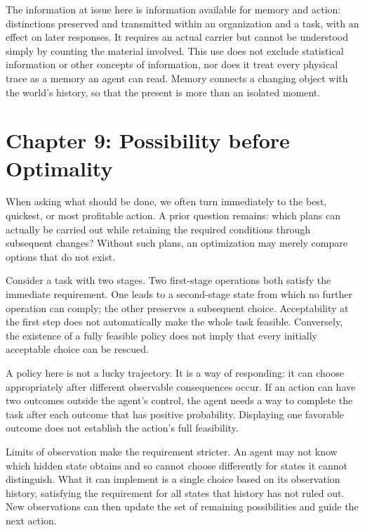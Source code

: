 \documentclass[
  english,
  11pt,
  oneside]{book}
\begin{document}
\begingroup{}

The information at issue here is information available for memory and action: distinctions preserved and transmitted within an organization and a task, with an effect on later responses. It requires an actual carrier but cannot be understood simply by counting the material involved. This use does not exclude statistical information or other concepts of information, nor does it treat every physical trace as a memory an agent can read. Memory connects a changing object with the world's history, so that the present is more than an isolated moment.

\par\endgroup

\chapter{Chapter 9: Possibility before Optimality}\label{ph-ch-09}

When asking what should be done, we often turn immediately to the best, quickest, or most profitable action. A prior question remains: which plans can actually be carried out while retaining the required conditions through subsequent changes? Without such plans, an optimization may merely compare options that do not exist.

Consider a task with two stages. Two first-stage operations both satisfy the immediate requirement. One leads to a second-stage state from which no further operation can comply; the other preserves a subsequent choice. Acceptability at the first step does not automatically make the whole task feasible. Conversely, the existence of a fully feasible policy does not imply that every initially acceptable choice can be rescued.

A policy here is not a lucky trajectory. It is a way of responding: it can choose appropriately after different observable consequences occur. If an action can have two outcomes outside the agent's control, the agent needs a way to complete the task after each outcome that has positive probability. Displaying one favorable outcome does not establish the action's full feasibility.

Limits of observation make the requirement stricter. An agent may not know which hidden state obtains and so cannot choose differently for states it cannot distinguish. What it can implement is a single choice based on its observation history, satisfying the requirement for all states that history has not ruled out. New observations can then update the set of remaining possibilities and guide the next action.
\end{document}
